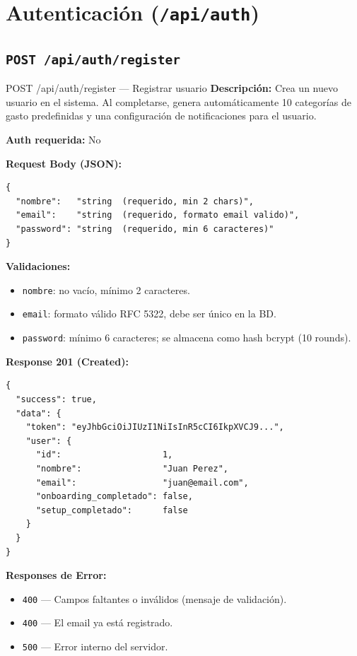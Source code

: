 \section{Autenticación (\texttt{/api/auth})}

\subsection{\texttt{POST /api/auth/register}}

\begin{epbox}{POST /api/auth/register --- Registrar usuario}
\textbf{Descripción:} Crea un nuevo usuario en el sistema. Al completarse, genera automáticamente 10 categorías de gasto predefinidas y una configuración de notificaciones para el usuario.

\textbf{Auth requerida:} No

\textbf{Request Body (JSON):}
\begin{lstlisting}[style=json]
{
  "nombre":   "string  (requerido, min 2 chars)",
  "email":    "string  (requerido, formato email valido)",
  "password": "string  (requerido, min 6 caracteres)"
}
\end{lstlisting}

\textbf{Validaciones:}
\begin{itemize}
  \item \texttt{nombre}: no vacío, mínimo 2 caracteres.
  \item \texttt{email}: formato válido RFC 5322, debe ser único en la BD.
  \item \texttt{password}: mínimo 6 caracteres; se almacena como hash bcrypt (10 rounds).
\end{itemize}

\textbf{Response 201 (Created):}
\begin{lstlisting}[style=json]
{
  "success": true,
  "data": {
    "token": "eyJhbGciOiJIUzI1NiIsInR5cCI6IkpXVCJ9...",
    "user": {
      "id":                    1,
      "nombre":                "Juan Perez",
      "email":                 "juan@email.com",
      "onboarding_completado": false,
      "setup_completado":      false
    }
  }
}
\end{lstlisting}

\textbf{Responses de Error:}
\begin{itemize}
  \item \texttt{400} --- Campos faltantes o inválidos (mensaje de validación).
  \item \texttt{400} --- El email ya está registrado.
  \item \texttt{500} --- Error interno del servidor.
\end{itemize}
\end{epbox}

